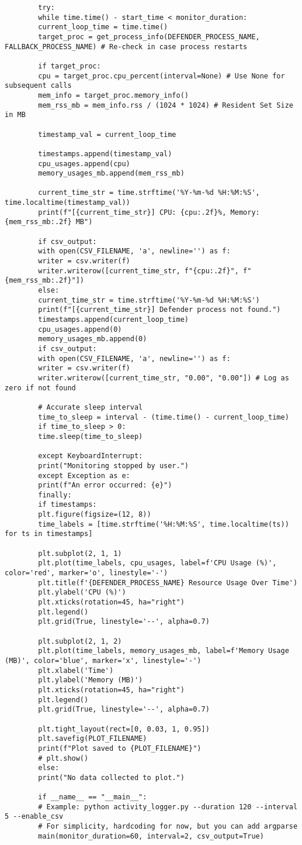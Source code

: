 \documentclass[11pt]{article}
\begin{document}
\begin{verbatim}
		try:
		while time.time() - start_time < monitor_duration:
		current_loop_time = time.time()
		target_proc = get_process_info(DEFENDER_PROCESS_NAME, FALLBACK_PROCESS_NAME) # Re-check in case process restarts
		
		if target_proc:
		cpu = target_proc.cpu_percent(interval=None) # Use None for subsequent calls
		mem_info = target_proc.memory_info()
		mem_rss_mb = mem_info.rss / (1024 * 1024) # Resident Set Size in MB
		
		timestamp_val = current_loop_time 
		
		timestamps.append(timestamp_val)
		cpu_usages.append(cpu)
		memory_usages_mb.append(mem_rss_mb)
		
		current_time_str = time.strftime('%Y-%m-%d %H:%M:%S', time.localtime(timestamp_val))
		print(f"[{current_time_str}] CPU: {cpu:.2f}%, Memory: {mem_rss_mb:.2f} MB")
		
		if csv_output:
		with open(CSV_FILENAME, 'a', newline='') as f:
		writer = csv.writer(f)
		writer.writerow([current_time_str, f"{cpu:.2f}", f"{mem_rss_mb:.2f}"])
		else:
		current_time_str = time.strftime('%Y-%m-%d %H:%M:%S')
		print(f"[{current_time_str}] Defender process not found.")
		timestamps.append(current_loop_time)
		cpu_usages.append(0) 
		memory_usages_mb.append(0)
		if csv_output:
		with open(CSV_FILENAME, 'a', newline='') as f:
		writer = csv.writer(f)
		writer.writerow([current_time_str, "0.00", "0.00"]) # Log as zero if not found
		
		# Accurate sleep interval
		time_to_sleep = interval - (time.time() - current_loop_time)
		if time_to_sleep > 0:
		time.sleep(time_to_sleep)
		
		except KeyboardInterrupt:
		print("Monitoring stopped by user.")
		except Exception as e:
		print(f"An error occurred: {e}")
		finally:
		if timestamps:
		plt.figure(figsize=(12, 8))
		time_labels = [time.strftime('%H:%M:%S', time.localtime(ts)) for ts in timestamps]
		
		plt.subplot(2, 1, 1)
		plt.plot(time_labels, cpu_usages, label=f'CPU Usage (%)', color='red', marker='o', linestyle='-')
		plt.title(f'{DEFENDER_PROCESS_NAME} Resource Usage Over Time')
		plt.ylabel('CPU (%)')
		plt.xticks(rotation=45, ha="right")
		plt.legend()
		plt.grid(True, linestyle='--', alpha=0.7)
		
		plt.subplot(2, 1, 2)
		plt.plot(time_labels, memory_usages_mb, label=f'Memory Usage (MB)', color='blue', marker='x', linestyle='-')
		plt.xlabel('Time')
		plt.ylabel('Memory (MB)')
		plt.xticks(rotation=45, ha="right")
		plt.legend()
		plt.grid(True, linestyle='--', alpha=0.7)
		
		plt.tight_layout(rect=[0, 0.03, 1, 0.95])
		plt.savefig(PLOT_FILENAME)
		print(f"Plot saved to {PLOT_FILENAME}")
		# plt.show() 
		else:
		print("No data collected to plot.")
		
		if __name__ == "__main__":
		# Example: python activity_logger.py --duration 120 --interval 5 --enable_csv
		# For simplicity, hardcoding for now, but you can add argparse
		main(monitor_duration=60, interval=2, csv_output=True)
	\end{verbatim}
\end{document}
